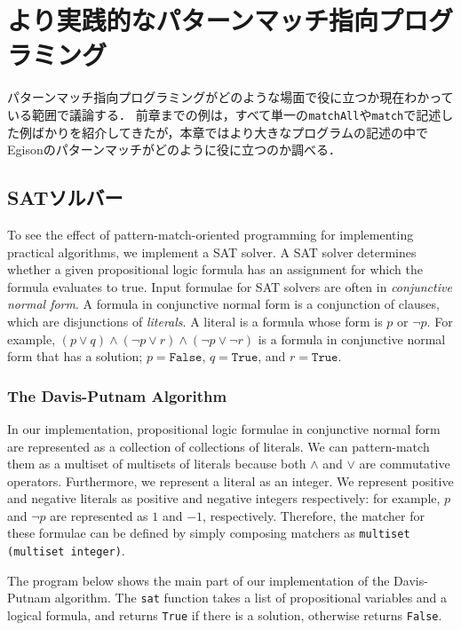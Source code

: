 \chapter{より実践的なパターンマッチ指向プログラミング}\label{practice}

パターンマッチ指向プログラミングがどのような場面で役に立つか現在わかっている範囲で議論する．
前章までの例は，すべて単一の\lstinline{matchAll}や\lstinline{match}で記述した例ばかりを紹介してきたが，本章ではより大きなプログラムの記述の中でEgisonのパターンマッチがどのように役に立つのか調べる．

\section{SATソルバー}\label{practice-sat}

To see the effect of pattern-match-oriented programming for implementing practical algorithms, we implement a SAT solver.
A SAT solver determines whether a given propositional logic formula has an assignment for which the formula evaluates to true.
Input formulae for SAT solvers are often in \emph{conjunctive normal form}.
A formula in conjunctive normal form is a conjunction of clauses, which are disjunctions of \emph{literals}.
A literal is a formula whose form is $p$ or $\neg p$.
For example, $(p \lor q) \wedge (\neg p \lor r) \wedge (\neg p \lor \neg r)$ is a formula in conjunctive normal form that has a solution; $p = \texttt{False}$, $q = \texttt{True}$, and $r = \texttt{True}$.

\subsection{The Davis-Putnam Algorithm}

In our implementation, propositional logic formulae in conjunctive normal form are represented as a collection of collections of literals.
We can pattern-match them as a multiset of multisets of literals because both $\wedge$ and $\lor$ are commutative operators.
Furthermore, we represent a literal as an integer.
We represent positive and negative literals as positive and negative integers respectively: for example, $p$ and $\neg p$ are represented as $1$ and $-1$, respectively.
Therefore, the matcher for these formulae can be defined by simply composing matchers as \lstinline{multiset (multiset integer)}.

The program below shows the main part of our implementation of the Davis-Putnam algorithm\cite{harrison2009handbook}.
The \lstinline{sat} function takes a list of propositional variables and a logical formula, and returns \lstinline{True} if there is a solution, otherwise returns \lstinline{False}.


